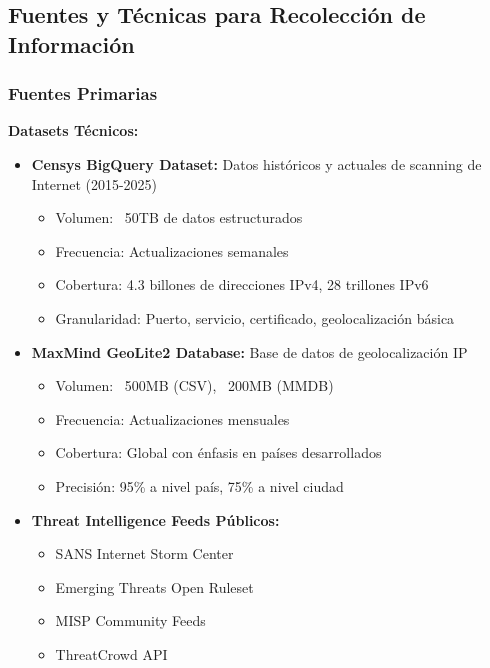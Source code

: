 \subsection{Fuentes y Técnicas para Recolección de Información}

\subsubsection{Fuentes Primarias}

\textbf{Datasets Técnicos:}
\begin{itemize}
    \item \textbf{Censys BigQuery Dataset:} Datos históricos y actuales de scanning de Internet (2015-2025)
    \begin{itemize}
        \item Volumen: ~50TB de datos estructurados
        \item Frecuencia: Actualizaciones semanales
        \item Cobertura: 4.3 billones de direcciones IPv4, 28 trillones IPv6
        \item Granularidad: Puerto, servicio, certificado, geolocalización básica
    \end{itemize}
    
    \item \textbf{MaxMind GeoLite2 Database:} Base de datos de geolocalización IP
    \begin{itemize}
        \item Volumen: ~500MB (CSV), ~200MB (MMDB)
        \item Frecuencia: Actualizaciones mensuales
        \item Cobertura: Global con énfasis en países desarrollados
        \item Precisión: 95\% a nivel país, 75\% a nivel ciudad
    \end{itemize}
    
    \item \textbf{Threat Intelligence Feeds Públicos:}
    \begin{itemize}
        \item SANS Internet Storm Center
        \item Emerging Threats Open Ruleset
        \item MISP Community Feeds
        \item ThreatCrowd API
    \end{itemize}
\end{itemize}

